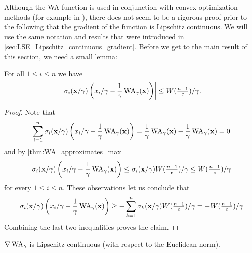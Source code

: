 Although the WA function is used in conjunction with convex optimization methods (for example in \cite{LuChenChangShaHuangTengCheng-ePlace}),
there does not seem to be a rigorous proof prior to the following that the gradient of the function is Lipschitz continuous.
We will use the same notation and results that were introduced in \cref{sec:LSE_Lipschitz_continuous_gradient}.
Before we get to the main result of this section, we need a small lemma:

\begin{lemma} \label{thm:WA_component_upper_bound}
 For all \(1 \leq i \leq n\) we have
 \[ \left\lvert \sigma_i(\mathbf{x}/\gamma) \left({ x_i/\gamma - \frac{1}{\gamma} \operatorname{WA}_\gamma(\mathbf{x}) }\right) \right\rvert \leq W(\tfrac{n-1}{e})/\gamma .\]
\end{lemma}

\begin{proof}
   Note that 
  \[ \sum_{i = 1}^n \sigma_i(\mathbf{x}/\gamma) \left({ x_i/\gamma - \frac{1}{\gamma} \operatorname{WA}_\gamma(\mathbf{x}) }\right) = \frac{1}{\gamma} \operatorname{WA}_\gamma(\mathbf{x}) - \frac{1}{\gamma} \operatorname{WA}_\gamma(\mathbf{x}) = 0 \]
  and by \cref{thm:WA_approximates_max}
  \[ \sigma_i(\mathbf{x}/\gamma) \left({ x_i/\gamma - \frac{1}{\gamma} \operatorname{WA}_\gamma(\mathbf{x}) }\right) \leq \sigma_i(\mathbf{x}/\gamma) W(\tfrac{n-1}{e}) / \gamma \leq W(\tfrac{n-1}{e})/\gamma \]
  for every \(1 \leq i \leq n\).
  These observations let us conclude that 
  \[ \sigma_i(\mathbf{x}/\gamma) \left({ x_i/\gamma - \frac{1}{\gamma} \operatorname{WA}_\gamma(\mathbf{x}) }\right) \geq - \sum_{k=1}^n \sigma_k(\mathbf{x}/\gamma) W(\tfrac{n-1}{e}) / \gamma = -W(\tfrac{n-1}{e}) / \gamma \]
  Combining the last two inequalities proves the claim.
\end{proof}


\begin{theorem} \label{thm:WA_Lipschitz_constant_upper_bound}
 \(\nabla \operatorname{WA}_\gamma\) is Lipschitz continuous (with respect to the Euclidean norm).
\end{theorem}

